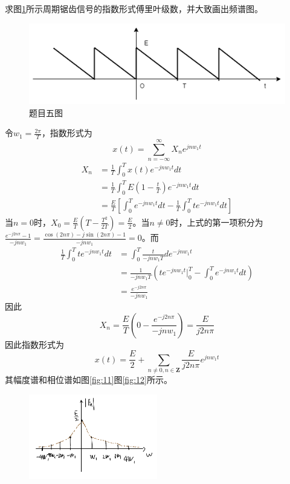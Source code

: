 \documentclass[answers]{exam}  %
\begin{document}
\begin{questions}
\question 求图\ref{fig:5}所示周期锯齿信号的指数形式傅里叶级数，并大致画出频谱图。

\begin{figure}
	\centering
	\includegraphics[width=\linewidth]{pics/dsp2-6.png}
	\caption{题目五图}
	\label{fig:5}
\end{figure}

\begin{solution}
	令$w_1=\frac{2\pi}{T}$，指数形式为$$x(t)=\sum_{n=-\infty}^{\infty}X_ne^{jnw_1t}$$
	\begin{align*}
		X_n&=\frac{1}{T}\int_{0}^{T}x(t)e^{-jnw_1t}dt\\
		&=\frac{1}{T}\int_{0}^{T}E(1-\frac{t}{T})e^{-jnw_1t}dt\\
		&=\frac{E}{T}[\int_{0}^{T}e^{-jnw_1t}dt-\frac{1}{T}\int_{0}^{T}te^{-jnw_1t}dt]
	\end{align*}
当$n=0$时，$X_0=\frac{E}{T}(T-\frac{T^2}{2T})=\frac{E}{2}$。当$n\neq0$时，上式的第一项积分为$\frac{e^{-j2n\pi}-1}{-jnw_1}=\frac{\cos(2n\pi)-j\sin(2n\pi)-1}{-jnw_1}=0$。而
\begin{align*}
	\frac{1}{T}\int_{0}^{T}te^{-jnw_1t}dt&=\int_{0}^{T}\frac{t}{-jnw_1T}de^{-jnw_1t}\\
	&=\frac{1}{-jnw_1T}(te^{-jnw_1t}\bigg|_0^T-\int_{0}^{T}e^{-jnw_1t}dt)\\
	&=\frac{e^{-j2n\pi}}{-jnw_1}
\end{align*}
因此$$X_n=\frac{E}{T}(0-\frac{e^{-j2n\pi}}{-jnw_1})=\frac{E}{j2n\pi}$$
因此指数形式为$$x(t)=\frac{E}{2}+\sum_{n\neq 0,n\in\mathbf{Z}}\frac{E}{j2n\pi}e^{jnw_1t}$$
其幅度谱和相位谱如图\ref{fig:11}图\ref{fig:12}所示。
\end{solution}
\begin{figure}
	\centering
	\includegraphics[width=0.5\textwidth]{pics/5-1.png}

\end{figure}
\end{questions}
\end{document}
